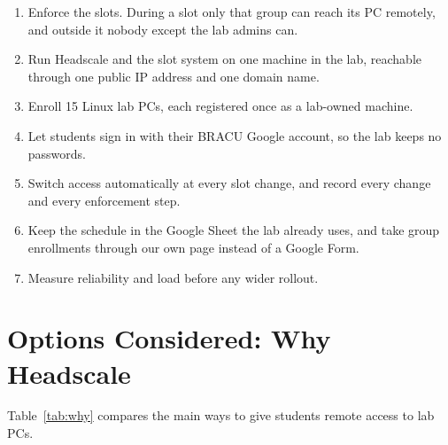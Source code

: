 \documentclass[11pt,a4paper]{article}
\begin{document}
\begin{enumerate}[leftmargin=1.6em]
  \item Enforce the slots. During a slot only that group can reach its PC
        remotely, and outside it nobody except the lab admins can.
  \item Run Headscale and the slot system on one machine in the lab, reachable
        through one public IP address and one domain name.
  \item Enroll 15 Linux lab PCs, each registered once as a lab-owned machine.
  \item Let students sign in with their BRACU Google account, so the lab keeps
        no passwords.
  \item Switch access automatically at every slot change, and record every
        change and every enforcement step.
  \item Keep the schedule in the Google Sheet the lab already uses, and take
        group enrollments through our own page instead of a Google Form.
  \item Measure reliability and load before any wider rollout.
\end{enumerate}

\newpage
\section{Options Considered: Why Headscale}

Table~\ref{tab:why} compares the main ways to give students remote access to lab PCs.
\end{document}
